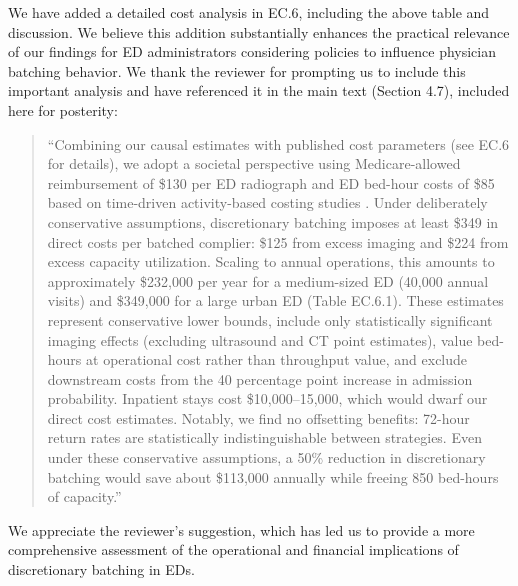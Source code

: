 \documentclass[11pt]{article}
\newcommand{\1}{\hbox{\rm 1\kern-.35em 1}}
\begin{document}
We have added a detailed cost analysis in EC.6, including the above table and discussion. We believe this addition substantially enhances the practical relevance of our findings for ED administrators considering policies to influence physician batching behavior. We thank the reviewer for prompting us to include this important analysis and have referenced it in the main text (Section 4.7), included here for posterity:

\begin{quote}
``Combining our causal estimates with published cost parameters (see EC.6 for details), we adopt a societal perspective using Medicare-allowed reimbursement of \$130 per ED radiograph \citep{dabus2025practice} and ED bed-hour costs of \$85 based on time-driven activity-based costing studies \citep{schreyer2017economics, canellas2024measurement}. Under deliberately conservative assumptions, discretionary batching imposes at least \$349 in direct costs per batched complier: \$125 from excess imaging and \$224 from excess capacity utilization. Scaling to annual operations, this amounts to approximately \$232,000 per year for a medium-sized ED (40,000 annual visits) and \$349,000 for a large urban ED (Table EC.6.1). These estimates represent conservative lower bounds, include only statistically significant imaging effects (excluding ultrasound and CT point estimates), value bed-hours at operational cost rather than throughput value, and exclude downstream costs from the 40 percentage point increase in admission probability. Inpatient stays cost \$10,000–15,000, which would dwarf our direct cost estimates. Notably, we find no offsetting benefits: 72-hour return rates are statistically indistinguishable between strategies. Even under these conservative assumptions, a 50\% reduction in discretionary batching would save about \$113,000 annually while freeing 850 bed-hours of capacity.''
\end{quote}

We appreciate the reviewer's suggestion, which has led us to provide a more comprehensive assessment of the operational and financial implications of discretionary batching in EDs.
\color{black}
\end{document}
